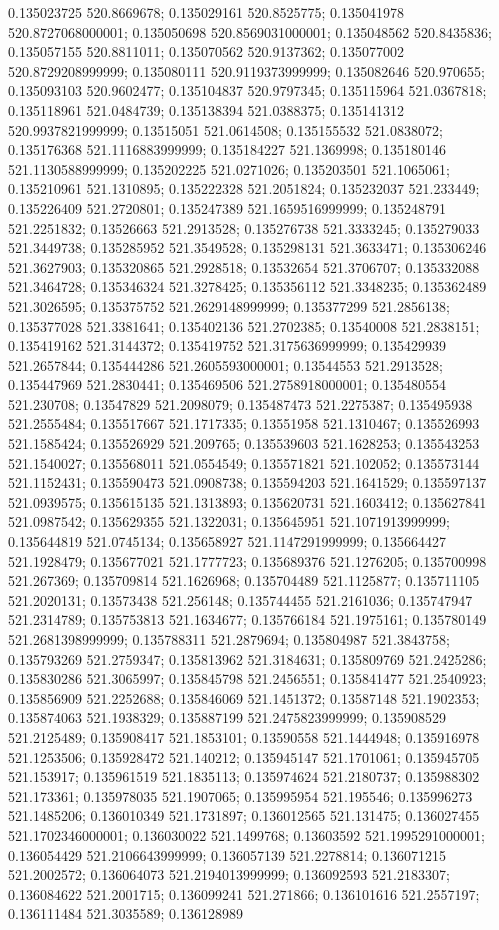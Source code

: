 0.135023725 520.8669678; 0.135029161 520.8525775; 0.135041978 520.8727068000001; 0.135050698 520.8569031000001; 0.135048562 520.8435836; 0.135057155 520.8811011; 0.135070562 520.9137362; 0.135077002 520.8729208999999; 0.135080111 520.9119373999999; 0.135082646 520.970655; 0.135093103 520.9602477; 0.135104837 520.9797345; 0.135115964 521.0367818; 0.135118961 521.0484739; 0.135138394 521.0388375; 0.135141312 520.9937821999999; 0.13515051 521.0614508; 0.135155532 521.0838072; 0.135176368 521.1116883999999; 0.135184227 521.1369998; 0.135180146 521.1130588999999; 0.135202225 521.0271026; 0.135203501 521.1065061; 0.135210961 521.1310895; 0.135222328 521.2051824; 0.135232037 521.233449; 0.135226409 521.2720801; 0.135247389 521.1659516999999; 0.135248791 521.2251832; 0.13526663 521.2913528; 0.135276738 521.3333245; 0.135279033 521.3449738; 0.135285952 521.3549528; 0.135298131 521.3633471; 0.135306246 521.3627903; 0.135320865 521.2928518; 0.13532654 521.3706707; 0.135332088 521.3464728; 0.135346324 521.3278425; 0.135356112 521.3348235; 0.135362489 521.3026595; 0.135375752 521.2629148999999; 0.135377299 521.2856138; 0.135377028 521.3381641; 0.135402136 521.2702385; 0.13540008 521.2838151; 0.135419162 521.3144372; 0.135419752 521.3175636999999; 0.135429939 521.2657844; 0.135444286 521.2605593000001; 0.13544553 521.2913528; 0.135447969 521.2830441; 0.135469506 521.2758918000001; 0.135480554 521.230708; 0.13547829 521.2098079; 0.135487473 521.2275387; 0.135495938 521.2555484; 0.135517667 521.1717335; 0.13551958 521.1310467; 0.135526993 521.1585424; 0.135526929 521.209765; 0.135539603 521.1628253; 0.135543253 521.1540027; 0.135568011 521.0554549; 0.135571821 521.102052; 0.135573144 521.1152431; 0.135590473 521.0908738; 0.135594203 521.1641529; 0.135597137 521.0939575; 0.135615135 521.1313893; 0.135620731 521.1603412; 0.135627841 521.0987542; 0.135629355 521.1322031; 0.135645951 521.1071913999999; 0.135644819 521.0745134; 0.135658927 521.1147291999999; 0.135664427 521.1928479; 0.135677021 521.1777723; 0.135689376 521.1276205; 0.135700998 521.267369; 0.135709814 521.1626968; 0.135704489 521.1125877; 0.135711105 521.2020131; 0.13573438 521.256148; 0.135744455 521.2161036; 0.135747947 521.2314789; 0.135753813 521.1634677; 0.135766184 521.1975161; 0.135780149 521.2681398999999; 0.135788311 521.2879694; 0.135804987 521.3843758; 0.135793269 521.2759347; 0.135813962 521.3184631; 0.135809769 521.2425286; 0.135830286 521.3065997; 0.135845798 521.2456551; 0.135841477 521.2540923; 0.135856909 521.2252688; 0.135846069 521.1451372; 0.13587148 521.1902353; 0.135874063 521.1938329; 0.135887199 521.2475823999999; 0.135908529 521.2125489; 0.135908417 521.1853101; 0.13590558 521.1444948; 0.135916978 521.1253506; 0.135928472 521.140212; 0.135945147 521.1701061; 0.135945705 521.153917; 0.135961519 521.1835113; 0.135974624 521.2180737; 0.135988302 521.173361; 0.135978035 521.1907065; 0.135995954 521.195546; 0.135996273 521.1485206; 0.136010349 521.1731897; 0.136012565 521.131475; 0.136027455 521.1702346000001; 0.136030022 521.1499768; 0.13603592 521.1995291000001; 0.136054429 521.2106643999999; 0.136057139 521.2278814; 0.136071215 521.2002572; 0.136064073 521.2194013999999; 0.136092593 521.2183307; 0.136084622 521.2001715; 0.136099241 521.271866; 0.136101616 521.2557197; 0.136111484 521.3035589; 0.136128989 